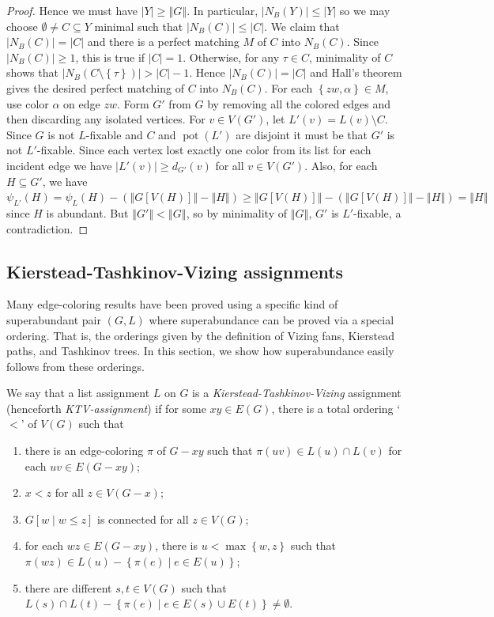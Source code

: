 \documentclass[12pt]{article}
\theoremstyle{plain}
\theoremstyle{definition}
\theoremstyle{remark}
\newcommand{\set}[1]{\left\{ #1 \right\}}
\newcommand{\setbs}[2]{\left\{ #1 \mid #2 \right\}}
\newcommand{\card}[1]{\left|#1\right|}
\newcommand{\size}[1]{\left\Vert#1\right\Vert}
\newcommand{\brackets}[1]{\left[ #1 \right]}
\newcommand{\pot}{\operatorname{pot}}
\begin{document}
\begin{proof}
	Hence we must have $|Y| \ge \size{G}$.  In particular, $\card{N_B(Y)} \le |Y|$ so we may choose $\emptyset \ne C \subseteq Y$ minimal such that $\card{N_B(C)} \le |C|$. We claim that $\card{N_B(C)} = |C|$ and there is a perfect matching $M$ of $C$ into $N_B(C)$.  Since $\card{N_B(C)} \ge 1$, this is true if $|C| = 1$.  Otherwise, for any $\tau \in C$, minimality of $C$ shows that $\card{N_B(C \setminus \set{\tau})} > |C| - 1$. Hence $\card{N_B(C)} = |C|$ and Hall's theorem gives the desired perfect matching of $C$ into $N_B(C)$.  For each $\set{zw, \alpha} \in M$, use color $\alpha$ on edge $zw$.  Form $G'$ from $G$ by removing all the colored edges and then discarding any isolated vertices. For $v \in V(G')$, let $L'(v) = L(v) \setminus C$.  Since $G$ is not $L$-fixable and $C$ and $\pot(L')$ are disjoint it must be that $G'$ is not $L'$-fixable.  Since each vertex lost exactly one color from its list for each incident edge we have $|L'(v)| \ge d_{G'}(v)$ for all $v \in V(G')$.  Also, for each $H \subseteq G'$, we have $\psi_{L'}(H) = \psi_{L}(H) - (\size{G[V(H)]} - \size{H}) \ge \size{G[V(H)]} - (\size{G[V(H)]} - \size{H}) = \size{H}$ since $H$ is abundant.  But $\size{G'} < \size{G}$, so by minimality of $\size{G}$, $G'$ is $L'$-fixable, a contradiction.
\end{proof}

\subsection{Kierstead-Tashkinov-Vizing assignments}
Many edge-coloring results have been proved using a specific kind of
superabundant pair $(G, L)$ where superabundance can be proved via a special
ordering. That is, the orderings given by the definition of Vizing fans,
Kierstead paths, and Tashkinov trees.  In this section, we show how
superabundance easily follows from these orderings.

We say that a list assignment $L$ on $G$ is a \emph{Kierstead-Tashkinov-Vizing} assignment (henceforth \emph{KTV-assignment}) if for some $xy \in E(G)$, there is a total ordering `$<$' of $V(G)$ such that

\begin{enumerate}
\item there is an edge-coloring $\pi$ of $G-xy$ such that $\pi(uv) \in L(u) \cap L(v)$ for each $uv \in E(G - xy)$; 
\item $x < z$ for all $z \in V(G - x)$; 
\item $G\brackets{w \mid w \le z}$ is connected for all $z \in V(G)$; 
\item for each $wz \in E(G - xy)$, there is $u < \max\set{w, z}$ such that $\pi(wz) \in L(u) - \setbs{\pi(e)}{e \in E(u)}$;
\item there are different $s, t \in V(G)$ such that $L(s) \cap L(t) - \setbs{\pi(e)}{e \in E(s) \cup E(t)} \ne \emptyset$.
\end{enumerate}
\end{document}
